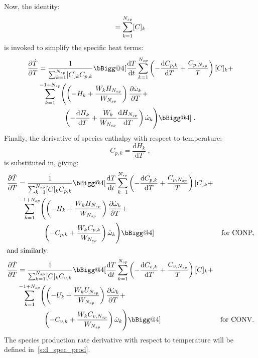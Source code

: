 \documentclass[12pt,number,sort&compress]{elsarticle}
\makeatletter
\newcommand{\vast}{\bBigg@{4}}
\makeatother
\begin{document}
Now, the identity:
\begin{equation}
 [C] = \sum_{k=1}^{\ns/} [C]_{k}
\end{equation}
is invoked to simplify the specific heat terms:
\begin{align}
 \frac{\partial\dot{T}}{\partial{T}} &= \frac{1}{\sum_{k=1}^{\ns/} [C]_{k} {C_{p, k}}} \vast[ \frac{\text{d} T }{\text{d} t } \sum_{k=1}^{\ns/} \left(- \frac{\text{d} C_{p, k} }{\text{d} T } + \frac{{C_{p, \ns/}}}{T}\right) [C]_{k} + \nonumber \\
				     & \sum_{k=1}^{-1 + \ns/} \Biggl(\left(- H_{k} + \frac{W_{k} H_{\ns/}}{W_{\ns/}}\right) \frac{\partial \dot{\omega}_{k} }{\partial T } + \nonumber \\
				     & \mathindent[largerst] \left(- \frac{\text{d} H_{k} }{\text{d} T } + \frac{W_{k}}{W_{\ns/}} \frac{\text{d} H_{\ns/} }{\text{d} T }\right) \dot{\omega}_{k}\Biggr)\vast]\;.
\end{align}
Finally, the derivative of species enthalpy with respect to temperature:
\begin{equation}
 C_{p,k} = \frac{\text{d}H_k}{\text{d}T}\;,
\end{equation}
is substituted in, giving:
\begin{subequations}
\label{e:dTdotdT_nojac}
\begin{align}
 \frac{\partial\dot{T}}{\partial{T}} &= \frac{1}{\sum_{k=1}^{\ns/} [C]_{k} {C_{p, k}}} \vast[ \frac{\text{d} T }{\text{d} t } \sum_{k=1}^{\ns/} \left(- \frac{\text{d} C_{p, k} }{\text{d} T } + \frac{{C_{p, \ns/}}}{T}\right) [C]_{k} + & \nonumber \\
				     & \sum_{k=1}^{-1 + \ns/} \Biggl( \left(- H_{k} + \frac{W_{k} H_{\ns/}}{W_{\ns/}}\right) \frac{\partial \dot{\omega}_{k} }{\partial T } + & \nonumber \\
				     & \mathindent[largerst] \left(- {C_{p, k}} + \frac{W_{k} {C_{p, k}} }{W_{\ns/}} \right) \dot{\omega}_{k}\Biggr)\vast] & \text{\dconp/,} \\
\intertext{and similarly:}
\frac{\partial\dot{T}}{\partial{T}}  &= \frac{1}{\sum_{k=1}^{\ns/} [C]_{k} {C_{v, k}}} \vast[ \frac{\text{d} T }{\text{d} t } \sum_{k=1}^{\ns/} \left(- \frac{\text{d} C_{v, k} }{\text{d} T } + \frac{{C_{v, \ns/}}}{T}\right) [C]_{k} + & \nonumber \\
				     & \sum_{k=1}^{-1 + \ns/} \Biggl(\left(- U_{k} + \frac{W_{k} U_{\ns/}}{W_{\ns/}}\right) \frac{\partial \dot{\omega}_{k} }{\partial T } + & \nonumber \\
				     & \mathindent[largerst] \left(- {C_{v, k}} + \frac{W_{k} {C_{v, \ns/}}}{W_{\ns/}}\right) \dot{\omega}_{k}\Biggr)\vast] & \text{\dconv/.}
\end{align}
\end{subequations}
The species production rate derivative with respect to temperature will be defined in~\cref{s:d_spec_prod}.
\end{document}
